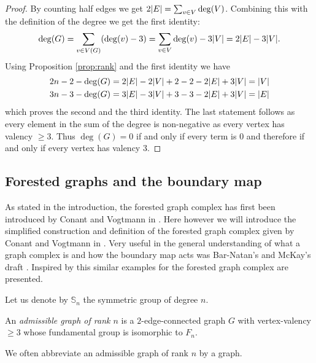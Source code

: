 \begin{proof}
	By counting half edges we get $2 \abs{E} = \sum_{v \in V} \deg(V)$.
	Combining this with the definition of the degree we get the first identity:
	\[
		\deg(G) = \sum_{v \in V(G)} (\deg(v) - 3) = \sum_{v \in V} \deg(v) - 3 \abs{V} = 2  \abs{E} - 3 \abs{V}
	.\] 
	Using Proposition \ref{prop:rank} and the first identity we have
	\begin{align*}
		2 n -2 - \deg(G) &= 2 \abs{E} - 2 \abs{V} + 2 - 2 - 2\abs{E} + 3 \abs{V} = \abs{V}\\
		3 n -3 - \deg(G) &= 3 \abs{E} - 3 \abs{V} + 3 - 3 - 2\abs{E} + 3 \abs{V} = \abs{E}
	\end{align*}
	which proves the second and the third identity. The last statement follows as every element in the sum of the degree is non-negative as every vertex has valency $\geq 3$.
	Thus $\deg(G) = 0$ if and only if every term is $0$ and therefore if and only if every vertex has valency $3$.
\end{proof}

\subsection{Forested graphs and the boundary map}
As stated in the introduction, the forested graph complex has first been introduced by Conant and Vogtmann in \cite{conant03}.
Here however we will introduce the simplified construction and definition of the forested graph complex given by Conant and Vogtmann in \cite{conant08}.
Very useful in the general understanding of  what a graph complex is and how the boundary map acts was Bar-Natan's and McKay's draft \cite{natan01}.
Inspired by this similar examples for the forested graph complex are presented.

Let us denote by $\mathbb{S}_{n}$ the symmetric group of degree $n$.
\begin{definition}
	An \emph{admissible graph of rank $n$} is a $2$-edge-connected graph $G$ with vertex-valency $\geq 3$ whose fundamental group is isomorphic to $F_{n}$.
\end{definition}

We often abbreviate an admissible graph of rank $n$ by a graph.

